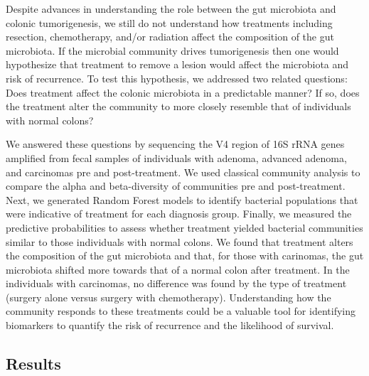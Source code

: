 \documentclass[12pt,]{article}
\begin{document}
Despite advances in understanding the role between the gut microbiota
and colonic tumorigenesis, we still do not understand how treatments
including resection, chemotherapy, and/or radiation affect the
composition of the gut microbiota. If the microbial community drives
tumorigenesis then one would hypothesize that treatment to remove a
lesion would affect the microbiota and risk of recurrence. To test this
hypothesis, we addressed two related questions: Does treatment affect
the colonic microbiota in a predictable manner? If so, does the
treatment alter the community to more closely resemble that of
individuals with normal colons?

We answered these questions by sequencing the V4 region of 16S rRNA
genes amplified from fecal samples of individuals with adenoma, advanced
adenoma, and carcinomas pre and post-treatment. We used classical
community analysis to compare the alpha and beta-diversity of
communities pre and post-treatment. Next, we generated Random Forest
models to identify bacterial populations that were indicative of
treatment for each diagnosis group. Finally, we measured the predictive
probabilities to assess whether treatment yielded bacterial communities
similar to those individuals with normal colons. We found that treatment
alters the composition of the gut microbiota and that, for those with
carinomas, the gut microbiota shifted more towards that of a normal
colon after treatment. In the individuals with carcinomas, no difference
was found by the type of treatment (surgery alone versus surgery with
chemotherapy). Understanding how the community responds to these
treatments could be a valuable tool for identifying biomarkers to
quantify the risk of recurrence and the likelihood of survival.

\newpage

\subsection{Results}\label{results}
\end{document}
